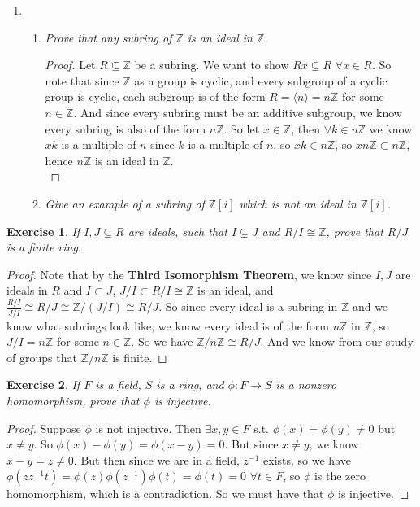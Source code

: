 \documentclass[10pt,oneside,reqno]{amsart}
\theoremstyle{plain}
\newtheorem{e}{Exercise}
\theoremstyle{definition}
\newcommand{\sub}{\subseteq}
\newcommand{\fa}{\forall}
\newcommand{\z}{\mathbb{Z}}
\begin{document}
\begin{enumerate}
\item []
\begin{enumerate}
\item \textit{Prove that any subring of $\mathbb{Z}$ is an ideal in $\mathbb{Z}$. }
\begin{proof}
Let $R\subseteq \mathbb{Z}$ be a subring. We want to show $Rx \sub R$ $\fa x \in R$. So note that since $\z$ as a group is cyclic, and every subgroup of a cyclic group is cyclic, each subgroup is of the form $R = \langle n \rangle = n\z$ for some $n \in \z$. And since every subring must be an additive subgroup, we know every subring is also of the form $n\z$. So let $x \in \z$, then $\fa k \in n\z$ we know $xk$ is a multiple of $n$ since $k$ is a multiple of $n$, so $xk \in n\z$, so $xn\z \subset n\z$, hence $n\z$ is an ideal in $\z$. \\
\end{proof}

\item \textit{Give an example of a subring of $\z[i]$ which is not an ideal in $\z[i]$. }
\end{enumerate}
\end{enumerate}

\begin{e}
If $I,J \sub R$ are ideals, such that $I \subsetneq J$ and $R/I \cong \z$, prove that $R/J$ is a finite ring. 
\end{e}
\begin{proof}
Note that by the \textbf{Third Isomorphism Theorem}, we know since $I,J$ are ideals in $R$ and $I \subset J$, $J/I \subset R/I \cong \z$ is an ideal, and $\frac{R/I}{J/I} \cong R/J \cong \z/(J/I) \cong R/J$. So since every ideal is a subring in $\z$ and we know what subrings look like, we know every ideal is of the form $n\z$ in $\z$, so $J/I = n\z$ for some $n \in \z$. So we have $\z/n\z \cong R/J$. And we know from our study of groups that $\z/n\z$ is finite. 
\end{proof}
\vspace{3mm}
\begin{e}
If $F$ is a field, $S$ is a ring, and $\phi:F \to S$ is a nonzero homomorphism, prove that $\phi$ is injective. 
\end{e}
\begin{proof}
Suppose $\phi$ is not injective. Then $\exists x,y \in F$ s.t. $\phi(x) = \phi(y) \neq 0$ but $x \neq y$. So $\phi(x) - \phi(y) = \phi(x - y) = 0$. But since $x \neq y$, we know $x - y  = z \neq 0$. But then since we are in a field, $z^{-1}$ exists, so we have $\phi(zz^{-1}t) = \phi(z)\phi(z^{-1})\phi(t) = \phi(t) = 0$ $\fa t \in F$, so $\phi$ is the zero homomorphism, which is a contradiction. So we must have that $\phi$ is injective. 
\end{proof}
\end{document}
